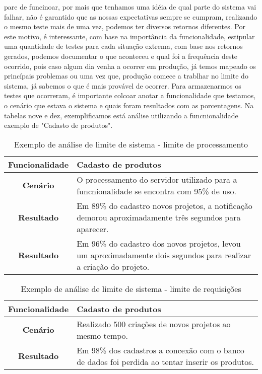     pare de funcinoar, por mais que tenhamos uma idéia de qual parte do sistema
    vai falhar, não é garantido que as nossas expectativas sempre se cumpram,
    realizando o mesmo teste mais de uma vez, podemos ter diversos retornos
    diferentes. Por este motivo, é interessante, com base na importância da
    funcionalidade, estipular uma quantidade de testes para cada situação extrema,
    com base nos retornos gerados, podemos documentar o que aconteceu e qual foi
    a frequência deste ocorrido, pois caso algum dia venha a ocorrer em produção,
    já temos mapeado os princípais problemas ou uma vez que, produção comece a
    trablhar no limite do sistema, já sabemos o que é mais provável de ocorrer.
    Para armazenarmos os testes que ocorreram, é importante colcoar anotar a
    funcionalidade que testamos, o cenário que estava o sistema e quais foram
    resultados com as porcentagens. Na tabelas nove e dez, exemplificamos está análise
    utilizando a funcnionalidade exemplo de "Cadasto de produtos". \newline

    \begin{table}[h!]
      \centering
      \begin{tabular}{|c|p{10cm}|}
        \hline
        \textbf{Funcionalidade} &
        Cadasto de produtos \\ \hline
        \textbf{Cenário} &
        O processamento do servidor utilizado para a funcnionalidade se encontra
        com 95\% de uso. \\ \hline
        \textbf{Resultado} &
        Em 89\% do cadastro novos projetos, a notificação demorou aproximadamente
        três segundos para aparecer. \\ \hline
        \textbf{Resultado} &
        Em 96\% do cadastro dos novos projetos, levou um aproximadamente dois
        segundos para realizar a criação do projeto. \\ \hline
      \end{tabular}
      \caption{Exemplo de análise de limite de sistema - limite de processamento}
      \label{Tabela:9}
    \end{table}

    \begin{table}[h!]
      \centering
      \begin{tabular}{|c|p{10cm}|}
        \hline
        \textbf{Funcionalidade} &
        Cadasto de produtos \\ \hline
        \textbf{Cenário} &
        Realizado 500 criações de novos projetos ao mesmo tempo. \\ \hline
        \textbf{Resultado} &
        Em 98\% dos cadastros a concexão com o banco de dados foi perdida ao tentar
        inserir os produtos. \\ \hline
      \end{tabular}
      \caption{Exemplo de análise de limite de sistema - limite de requisições}
      \label{Tabela:10}
    \end{table}

